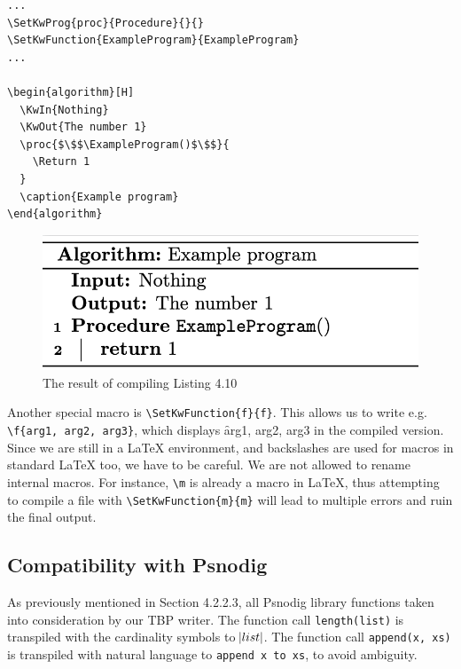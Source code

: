 \begin{lstlisting}[caption={Example program with Algorithm2e to show macros in action}, captionpos=b]
...
\SetKwProg{proc}{Procedure}{}{}
\SetKwFunction{ExampleProgram}{ExampleProgram}
...
    
\begin{algorithm}[H]
  \KwIn{Nothing}
  \KwOut{The number 1}
  \proc{$\$$\ExampleProgram()$\$$}{
    \Return 1
  }
  \caption{Example program}
\end{algorithm}

\end{lstlisting}

\begin{figure}[ht]
    \centering
    \includegraphics[scale=0.6]{assets/exampleProgramAlgorithm2e.png}
    \caption{The result of compiling Listing 4.10}
    \label{fig:algorithm2e_mini_example}
\end{figure}

Another special macro is \texttt{\textbackslash SetKwFunction\{f\}\{f\}}. This allows us to write e.g. \texttt{\textbackslash f\{arg1, arg2, arg3\}}, which displays \f{arg1, arg2, arg3} in the compiled version. \hfill \\

Since we are still in a LaTeX environment, and backslashes are used for macros in standard LaTeX too, we have to be careful. We are not allowed to rename internal macros. For instance, \texttt{\textbackslash m} is already a macro in LaTeX, thus attempting to compile a file with \texttt{\textbackslash SetKwFunction\{m\}\{m\}} will lead to multiple errors and ruin the final output.

\subsection{Compatibility with Psnodig}

As previously mentioned in Section 4.2.2.3, all Psnodig library functions taken into consideration by our TBP writer. The function call \texttt{length(list)} is transpiled with the cardinality symbols to \hspace{.01cm} $\abs{list}$. The function call \texttt{append(x, xs)} is transpiled with natural language to \texttt{append x to xs}, to avoid ambiguity. \hfill \\

